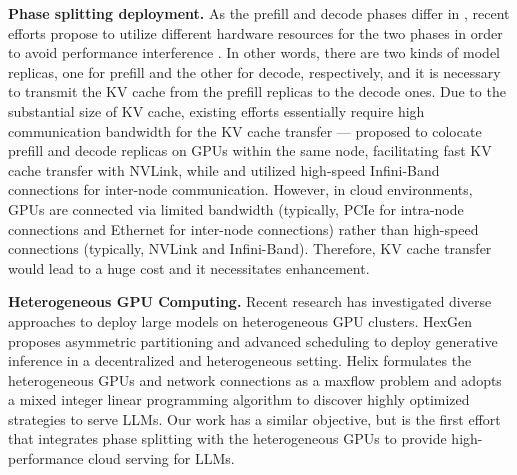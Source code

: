 % 





\noindent \textbf{Phase splitting deployment.}
As the prefill and decode phases differ in , recent efforts propose to utilize different hardware resources for the two phases in order to avoid performance interference \cite{patel2023splitwise,zhong2024distserve,hu2024inference,jin2024p,qin2024mooncake}. In other words, there are two kinds of model replicas, one for prefill and the other for decode, respectively, and it is necessary to transmit the KV cache from the prefill replicas to the decode ones. 
Due to the substantial size of KV cache, existing efforts essentially require high communication bandwidth for the KV cache transfer ---
\citet{zhong2024distserve} proposed to colocate prefill and decode replicas on GPUs within the same node, facilitating fast KV cache transfer with NVLink, while \citet{patel2023splitwise} and \citet{hu2024inference} utilized high-speed Infini-Band connections for inter-node communication. 
However, in cloud environments, GPUs are connected via limited bandwidth (typically, PCIe for intra-node connections and Ethernet for inter-node connections) rather than high-speed connections (typically, NVLink and Infini-Band). Therefore, KV cache transfer would lead to a huge cost and it necessitates enhancement.


\textbf{Heterogeneous GPU Computing.} Recent research has investigated diverse approaches to deploy large models on heterogeneous GPU clusters. 
HexGen \cite{jiang2024hexgen} proposes asymmetric partitioning and advanced scheduling to deploy generative inference in a decentralized and heterogeneous setting. 
Helix \cite{mei2024helix} formulates the heterogeneous GPUs and network connections as a maxflow problem and adopts a mixed integer linear programming algorithm to discover highly optimized strategies to serve LLMs. 
Our work has a similar objective, but is the first effort that integrates phase splitting with the heterogeneous GPUs to provide high-performance cloud serving for LLMs.



